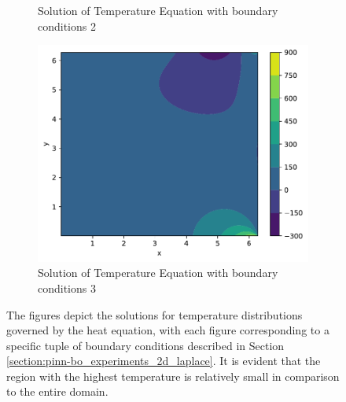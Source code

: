 \begin{figure}[ht]
\begin{subfigure}[b]{0.49\textwidth}
        \caption{Solution of Temperature Equation with boundary conditions 2}
        \label{fig:heat_2_dist}
    \end{subfigure}
    \hfill
    \begin{subfigure}[b]{0.5\textwidth}
        \centering
        \includegraphics[width=\textwidth]{Figures/PINN-BO/heat_py_pde_1000_test_3.pdf}
        \caption{Solution of Temperature Equation with boundary conditions 3}
        \label{fig:heat_3_dist}
    \end{subfigure}
    \caption{The figures depict the solutions for temperature distributions governed by the heat equation, with each figure corresponding to a specific tuple of boundary conditions described in Section \ref{section:pinn-bo_experiments_2d_laplace}. It is evident that the region with the highest temperature is relatively small in comparison to the entire domain.}
    \label{fig:heat_dist}
\end{figure}

